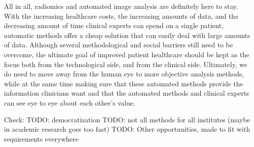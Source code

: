 All in all, radiomics and automated image analysis are definitely here to stay.
With the increasing healthcare costs, the increasing amounts of data, and the decreasing amount of time clinical experts can spend on a single patient, automatic methods offer a cheap solution that can easily deal with large amounts of data.
Although several methodological and social barriers still need to be overcome, the ultimate goal of improved patient healthcare should be kept as the focus both from the technological side, and from the clinical side.
Ultimately, we do need to move away from the human eye to more objective analysis methods, while at the same time making sure that these automated methods provide the information clinicians want and that the automated methods and clinical experts can see eye to eye about each other's value.

Check:
TODO: democratization
TODO: not all methods for all institutes (maybe in academic research goes too fast)
TODO: Other opportunities, made to fit with requirements everywhere
